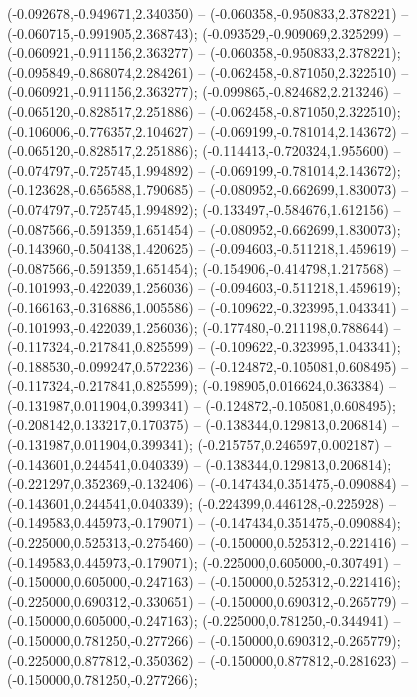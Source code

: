  (-0.092678,-0.949671,2.340350) -- (-0.060358,-0.950833,2.378221) -- (-0.060715,-0.991905,2.368743);
 (-0.093529,-0.909069,2.325299) -- (-0.060921,-0.911156,2.363277) -- (-0.060358,-0.950833,2.378221);
 (-0.095849,-0.868074,2.284261) -- (-0.062458,-0.871050,2.322510) -- (-0.060921,-0.911156,2.363277);
 (-0.099865,-0.824682,2.213246) -- (-0.065120,-0.828517,2.251886) -- (-0.062458,-0.871050,2.322510);
 (-0.106006,-0.776357,2.104627) -- (-0.069199,-0.781014,2.143672) -- (-0.065120,-0.828517,2.251886);
 (-0.114413,-0.720324,1.955600) -- (-0.074797,-0.725745,1.994892) -- (-0.069199,-0.781014,2.143672);
 (-0.123628,-0.656588,1.790685) -- (-0.080952,-0.662699,1.830073) -- (-0.074797,-0.725745,1.994892);
 (-0.133497,-0.584676,1.612156) -- (-0.087566,-0.591359,1.651454) -- (-0.080952,-0.662699,1.830073);
 (-0.143960,-0.504138,1.420625) -- (-0.094603,-0.511218,1.459619) -- (-0.087566,-0.591359,1.651454);
 (-0.154906,-0.414798,1.217568) -- (-0.101993,-0.422039,1.256036) -- (-0.094603,-0.511218,1.459619);
 (-0.166163,-0.316886,1.005586) -- (-0.109622,-0.323995,1.043341) -- (-0.101993,-0.422039,1.256036);
 (-0.177480,-0.211198,0.788644) -- (-0.117324,-0.217841,0.825599) -- (-0.109622,-0.323995,1.043341);
 (-0.188530,-0.099247,0.572236) -- (-0.124872,-0.105081,0.608495) -- (-0.117324,-0.217841,0.825599);
 (-0.198905,0.016624,0.363384) -- (-0.131987,0.011904,0.399341) -- (-0.124872,-0.105081,0.608495);
 (-0.208142,0.133217,0.170375) -- (-0.138344,0.129813,0.206814) -- (-0.131987,0.011904,0.399341);
 (-0.215757,0.246597,0.002187) -- (-0.143601,0.244541,0.040339) -- (-0.138344,0.129813,0.206814);
 (-0.221297,0.352369,-0.132406) -- (-0.147434,0.351475,-0.090884) -- (-0.143601,0.244541,0.040339);
 (-0.224399,0.446128,-0.225928) -- (-0.149583,0.445973,-0.179071) -- (-0.147434,0.351475,-0.090884);
 (-0.225000,0.525313,-0.275460) -- (-0.150000,0.525312,-0.221416) -- (-0.149583,0.445973,-0.179071);
 (-0.225000,0.605000,-0.307491) -- (-0.150000,0.605000,-0.247163) -- (-0.150000,0.525312,-0.221416);
 (-0.225000,0.690312,-0.330651) -- (-0.150000,0.690312,-0.265779) -- (-0.150000,0.605000,-0.247163);
 (-0.225000,0.781250,-0.344941) -- (-0.150000,0.781250,-0.277266) -- (-0.150000,0.690312,-0.265779);
 (-0.225000,0.877812,-0.350362) -- (-0.150000,0.877812,-0.281623) -- (-0.150000,0.781250,-0.277266);
